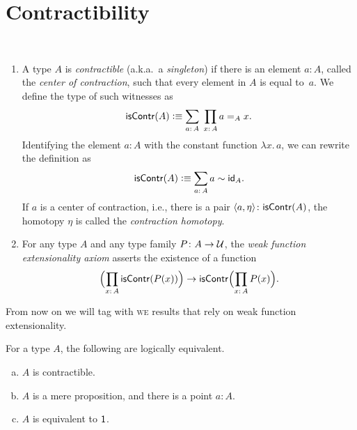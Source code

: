 \section{Contractibility}

\begin{defns}\ 
    \begin{enumerate}[-]
        \item A type $A$ is \textsl{contractible} (a.k.a.~a \textsl{singleton}) if there is an element $a\colon A$, called the \textsl{center of contraction}, such that every element in $A$ is equal to~$a$. We define the type of such witnesses as
        \[
            \fun{isContr}(A)\defeq\sum_{a\colon A}\;\prod_{x\colon A}a\eq{A}x.
        \]
        Identifying the element $a\colon A$ with the constant function $\lambda x.\,a$, we can rewrite the definition as
        \[
            \fun{isContr}(A)\defeq\sum_{a\colon A}a\sim\id_A.
        \]
        If $a$ is a center of contraction, i.e., there is a pair $\dep{a,\eta}\colon\fun{isContr}(A)$, the homotopy $\eta$ is called the \textsl{contraction homotopy}.
        
        \item For any type $A$ and any type family $P\colon A\to\univ$, the \textsl{weak function extensionality axiom} asserts the existence of a function
        \[
            \Bigl(\prod_{x\colon A}\fun{isContr}(P(x))\Bigr)
            \to\fun{isContr}\Bigl(\prod_{x\colon A}P(x)\Bigr).
        \]
    \end{enumerate}
\end{defns}

\begin{ntn}
    From now on we will tag with {\upshape\textsc{we}} results that rely on weak function extensionality.
\end{ntn}

\begin{lem}\label{lem:contractible-equivalences}
    For a type\/ $A$, the following are logically equivalent.
    \begin{enumerate}[a), font=\upshape]
        \item $A$ is contractible.
        \item $A$ is a mere proposition, and there is a point\/ $a\colon A$.
        \item $A$ is equivalent to\/ $\mathsf{1}$.
    \end{enumerate}
\end{lem}

